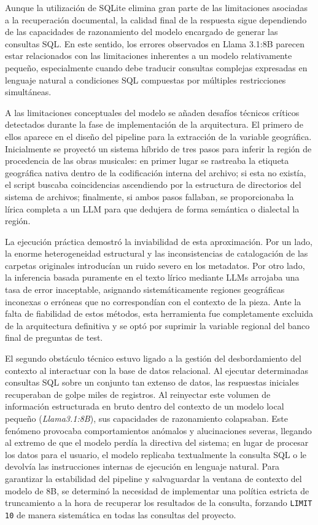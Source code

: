 Aunque la utilización de SQLite elimina gran parte de las limitaciones asociadas a la recuperación documental, la calidad final de la respuesta sigue dependiendo de las capacidades de razonamiento del modelo encargado de generar las consultas SQL. En este sentido, los errores observados en Llama 3.1:8B parecen estar relacionados con las limitaciones inherentes a un modelo relativamente pequeño, especialmente cuando debe traducir consultas complejas expresadas en lenguaje natural a condiciones SQL compuestas por múltiples restricciones simultáneas.

A las limitaciones conceptuales del modelo se añaden desafíos técnicos críticos detectados durante la fase de implementación de la arquitectura. El primero de ellos aparece en el diseño del pipeline para la extracción de la variable geográfica. Inicialmente se proyectó un sistema híbrido de tres pasos para inferir la región de procedencia de las obras musicales: en primer lugar se rastreaba la etiqueta geográfica nativa dentro de la codificación interna del archivo; si esta no existía, el script buscaba coincidencias ascendiendo por la estructura de directorios del sistema de archivos; finalmente, si ambos pasos fallaban, se proporcionaba la lírica completa a un LLM para que dedujera de forma semántica o dialectal la región. 

La ejecución práctica demostró la inviabilidad de esta aproximación. Por un lado, la enorme heterogeneidad estructural y las inconsistencias de catalogación de las carpetas originales introducían un ruido severo en los metadatos. Por otro lado, la inferencia basada puramente en el texto lírico mediante LLMs arrojaba una tasa de error inaceptable, asignando sistemáticamente regiones geográficas inconexas o erróneas que no correspondían con el contexto de la pieza. Ante la falta de fiabilidad de estos métodos, esta herramienta fue completamente excluida de la arquitectura definitiva y se optó por suprimir la variable regional del banco final de preguntas de test.

El segundo obstáculo técnico estuvo ligado a la gestión del desbordamiento del contexto al interactuar con la base de datos relacional. Al ejecutar determinadas consultas SQL sobre un conjunto tan extenso de datos, las respuestas iniciales recuperaban de golpe miles de registros. Al reinyectar este volumen de información estructurada en bruto dentro del contexto de un modelo local pequeño (\textit{Llama3.1:8B}), sus capacidades de razonamiento colapsaban. Este fenómeno provocaba comportamientos anómalos y alucinaciones severas, llegando al extremo de que el modelo perdía la directiva del sistema; en lugar de procesar los datos para el usuario, el modelo replicaba textualmente la consulta SQL o le devolvía las instrucciones internas de ejecución en lenguaje natural. Para garantizar la estabilidad del pipeline y salvaguardar la ventana de contexto del modelo de 8B, se determinó la necesidad de implementar una política estricta de truncamiento a la hora de recuperar los resultados de la consulta, forzando \texttt{LIMIT 10} de manera sistemática en todas las consultas del proyecto.

